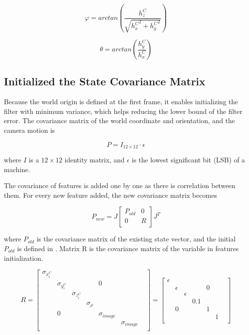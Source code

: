 \begin{equation}
\varphi 
=arctan\left(\frac{h_{z}^{C}}{\sqrt{{h_{x}^{C}}^{2}+{h_{y}^{C}}^{2}}}\right)
\end{equation}

\begin{equation}
\theta =arctan\left(\frac{h_{y}^{C}}{h_{x}^{C}}\right)
\end{equation}


\subsection{Initialized the State Covariance Matrix}

Because the world origin is defined at the first frame, it enables 
initializing the filter with minimum variance, which helps reducing the 
lower bound of the filter error. The covariance matrix of the world 
coordinate and orientation, and the camera motion is 

\begin{equation}
P=I_{12\times 12}\cdot \epsilon 
\end{equation}

where $I$ is a $12\times12$ identity matrix, and $\epsilon $ is the 
lowest significant bit (LSB) of a machine.

The covariance of features is added one by one as there is 
correlation between them. For every new feature added, the new 
covariance matrix becomes

\begin{equation}
\label{eq:Pnew}
P_{new}=J\begin{bmatrix}
P_{old} & 0 \\
0 & R \\
\end{bmatrix}
J^{T}
\end{equation}

\noindent where $P_{old}$ is the covariance matrix of the existing state vector, 
and the initial $P_{old}$ is defined in . Matrix R is the covariance 
matrix of the variable in features initialization.

\begin{equation}
R=\begin{bmatrix}
\sigma _{x_{i}^{C}} & & & & & & \\
 & \sigma _{y_{i}^{C}} & & & 0 & & \\
 & & \sigma _{z_{i}^{C}} & & & & \\
 & & & \sigma _{\rho } & & & \\
 & 0 & & & \sigma _{image} & & \\
 & & & & & \sigma _{image} & \\
\end{bmatrix}
 = \begin{bmatrix}
\epsilon & & & & & & \\
 & \epsilon & & & 0 & & \\
 & & \epsilon & & & & \\
 & & & 0.1 & & & \\
 & 0 & & & 1 & & \\
 & & & & & 1 & \\
\end{bmatrix} 
\end{equation}

